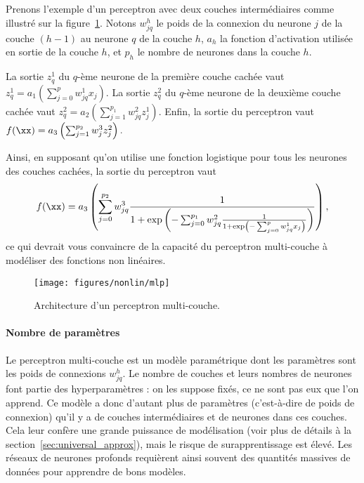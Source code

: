 \begin{exemple}
  Prenons l'exemple d'un perceptron avec deux couches intermédiaires comme
  illustré sur la figure~\ref{fig:mlp}. Notons $w^h_{jq}$ le poids de la
  connexion du neurone $j$ de la couche $(h-1)$ au neurone $q$ de la couche
  $h$, $a_h$ la fonction d'activation utilisée en sortie de la couche $h$,
  et $p_h$ le nombre de neurones dans la couche $h$.
  
  La sortie $z_q^1$ du $q$-ème neurone
  de la première couche cachée vaut
    $z_q^1 = a_1\left(\sum_{j=0}^p w_{jq}^1 x_j \right).$
  La sortie $z_q^2$ du $q$-ème neurone de la deuxième couche cachée vaut
    $z_q^2 = a_2\left(\sum_{j=1}^{p_1} w_{jq}^2 z_j^1 \right).$
  Enfin, la sortie du perceptron vaut
    $f(\xx) = a_3\left(\sum_{j=1}^{p_2} w_{j}^3 z_j^2 \right).$
  
  Ainsi, en supposant qu'on utilise une fonction logistique pour tous les
  neurones des couches cachées, la sortie du perceptron vaut 
  \begin{equation*}
    f(\xx) = a_3\left(\sum_{j=0}^{p_2} w_{jq}^3 \frac1{1 + 
        \exp\left(- \sum_{j=0}^{p_1} w_{jq}^2 \frac1{1 + 
            \exp\left(- \sum_{j=0}^p w_{jq}^1 x_j \right)} \right)} \right),
  \end{equation*}
  ce qui devrait vous convaincre de la capacité du perceptron multi-couche à
  modéliser des fonctions non linéaires.
\end{exemple}
  
\begin{figure}[h]
  \centering
  \texttt{[image: figures/nonlin/mlp]}
  \caption{Architecture d'un perceptron multi-couche. }
  \label{fig:mlp}
\end{figure}

\paragraph{Nombre de paramètres} Le perceptron multi-couche est un modèle
paramétrique dont les paramètres sont les poids de connexions $w_{jq}^h$. Le
nombre de couches et leurs nombres de neurones font partie des hyperparamètres
: on les suppose fixés, ce ne sont pas eux que l'on apprend. Ce modèle a donc
d'autant plus de paramètres (c'est-à-dire de poids de connexion) qu'il y a de
couches intermédiaires et de neurones dans ces couches. Cela leur confère une
grande puissance de modélisation (voir plus de détails à la
section~\ref{sec:universal_approx}), mais le risque de surapprentissage est
élevé.  Les réseaux de neurones profonds requièrent ainsi souvent des quantités
massives de données pour apprendre de bons modèles.

